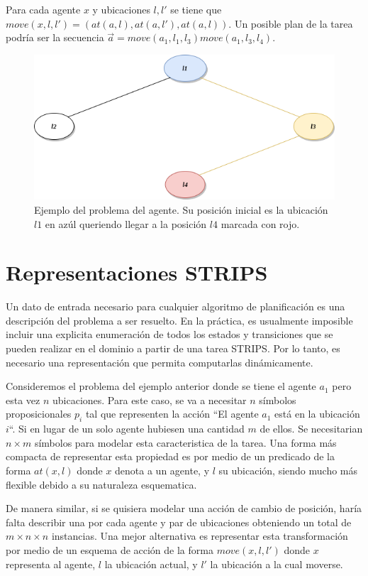 Para cada agente $x$ y ubicaciones $l, l'$ se tiene que $move(x, l, l') =
({at(a, l)}, {at(a, l')}, {at(a, l)})$. Un posible plan de la tarea podría ser
la secuencia $\vec{a} = move(a_1, l_1, l_3)move(a_1, l_3, l_4)$.

\begin{figure}
    \centering
    \includegraphics[scale=0.5]{figures/agent_example.png}
    \caption{Ejemplo del problema del agente. Su posición inicial es la ubicación
             $l1$ en azúl queriendo llegar a la posición $l4$ marcada con rojo.}
\end{figure}


\section{Representaciones STRIPS}

Un dato de entrada necesario para cualquier algoritmo de planificación es una
descripción del problema a ser resuelto. En la práctica, es usualmente imposible
incluir una explicita enumeración de todos los estados y transiciones que se
pueden realizar en el dominio a partir de una tarea STRIPS. Por lo tanto, es
necesario una representación que permita computarlas dinámicamente.

Consideremos el problema del ejemplo anterior donde se tiene el agente $a_1$
pero esta vez $n$ ubicaciones. Para este caso, se va a necesitar $n$ símbolos
proposicionales $p_i$ tal que representen la acción ``El agente $a_1$ está en la
ubicación $i$``. Si en lugar de un solo agente hubiesen una cantidad $m$ de
ellos. Se necesitarian $n \times m$ símbolos para modelar esta caracteristica de
la tarea. Una forma más compacta de representar esta propiedad es por medio de
un predicado de la forma $at(x, l)$ donde $x$ denota a un agente, y $l$ su
ubicación, siendo mucho más flexible debido a su naturaleza esquematica.

De manera similar, si se quisiera modelar una acción de cambio de posición,
haría falta describir una por cada agente y par de ubicaciones obteniendo un
total de $m \times n \times n$ instancias. Una mejor alternativa es representar
esta transformación por medio de un esquema de acción de la forma $move(x, l,
l')$ donde $x$ representa al agente, $l$ la ubicación actual, y $l'$ la ubicación
a la cual moverse.

